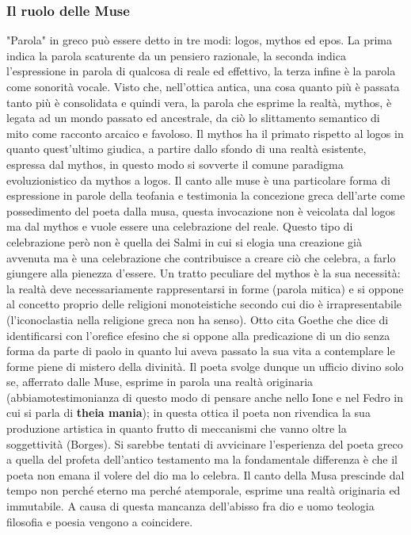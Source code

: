 \documentclass[10pt,a4paper]{article}
\begin{document}
\subsubsection{Il ruolo delle Muse}
"Parola" in greco può essere detto in tre modi: logos, mythos ed epos. La prima indica la parola scaturente da un pensiero razionale, la seconda indica l'espressione in parola di qualcosa di reale ed effettivo, la terza infine è la parola come sonorità vocale. Visto che, nell'ottica antica, una cosa quanto più è passata tanto più è consolidata e quindi vera, la parola che esprime la realtà, mythos, è legata ad un mondo passato ed ancestrale, da ciò lo slittamento semantico di mito come racconto arcaico e favoloso. Il mythos ha il primato rispetto al logos in quanto quest'ultimo giudica, a partire dallo sfondo di una realtà esistente, espressa dal mythos, in questo modo si sovverte il comune paradigma evoluzionistico da mythos a logos. Il canto alle muse è una particolare forma di espressione in parole della teofania e testimonia la concezione greca dell'arte come possedimento del poeta dalla musa, questa invocazione non è veicolata dal logos ma dal mythos e vuole essere una celebrazione del reale. Questo tipo di celebrazione però non è quella dei Salmi in cui si elogia una creazione già avvenuta ma è una celebrazione che contribuisce a creare ciò che celebra, a farlo giungere alla pienezza d'essere. Un tratto peculiare del mythos è la sua necessità: la realtà deve necessariamente rappresentarsi in forme (parola mitica) e si oppone al concetto proprio delle religioni monoteistiche secondo cui dio è irrapresentabile (l'iconoclastia nella religione greca non ha senso). Otto cita Goethe che dice di identificarsi con l'orefice efesino che si oppone alla predicazione di un dio senza forma da parte di paolo in quanto lui aveva passato la sua vita a contemplare le forme piene di mistero della divinità. Il poeta svolge dunque un ufficio divino solo se, afferrato dalle Muse, esprime in parola una realtà originaria (abbiamotestimonianza di questo modo di pensare anche nello Ione e nel Fedro in cui si parla di \textbf{theia mania}); in questa ottica il poeta non rivendica la sua produzione artistica in quanto frutto di meccanismi che vanno oltre la soggettività (Borges). Si sarebbe tentati di avvicinare l'esperienza del poeta greco a quella del profeta dell'antico testamento ma la fondamentale differenza è che il poeta non emana il volere del dio ma lo celebra. Il canto della Musa prescinde dal tempo non perché eterno ma perché atemporale, esprime una realtà originaria ed immutabile. A causa di questa mancanza dell'abisso fra dio e uomo teologia filosofia e poesia vengono a coincidere.
\end{document}
